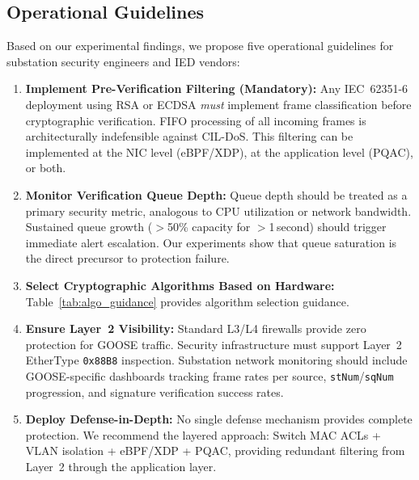 \documentclass[journal]{IEEEtran}
\begin{document}

\subsection{Operational Guidelines}
Based on our experimental findings, we propose five operational guidelines for substation security engineers and IED vendors:

\begin{enumerate}[leftmargin=*]
    \item \textbf{Implement Pre-Verification Filtering (Mandatory):} Any IEC~62351-6 deployment using RSA or ECDSA \emph{must} implement frame classification before cryptographic verification. FIFO processing of all incoming frames is architecturally indefensible against CIL-DoS. This filtering can be implemented at the NIC level (eBPF/XDP), at the application level (PQAC), or both.
    
    \item \textbf{Monitor Verification Queue Depth:} Queue depth should be treated as a primary security metric, analogous to CPU utilization or network bandwidth. Sustained queue growth ($>$50\% capacity for $>$1\,second) should trigger immediate alert escalation. Our experiments show that queue saturation is the direct precursor to protection failure.
    
    \item \textbf{Select Cryptographic Algorithms Based on Hardware:} Table~\ref{tab:algo_guidance} provides algorithm selection guidance.
    
    \item \textbf{Ensure Layer~2 Visibility:} Standard L3/L4 firewalls provide zero protection for GOOSE traffic. Security infrastructure must support Layer~2 EtherType \texttt{0x88B8} inspection. Substation network monitoring should include GOOSE-specific dashboards tracking frame rates per source, \texttt{stNum}/\texttt{sqNum} progression, and signature verification success rates.
    
    \item \textbf{Deploy Defense-in-Depth:} No single defense mechanism provides complete protection. We recommend the layered approach: Switch MAC ACLs + VLAN isolation + eBPF/XDP + PQAC, providing redundant filtering from Layer~2 through the application layer.
\end{enumerate}
\end{document}
